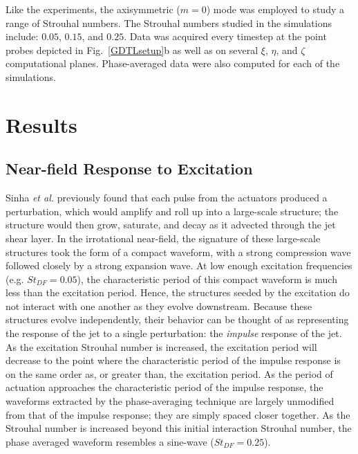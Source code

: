 \documentclass[english]{aiaa-tc}
\begin{document}
Like the experiments, the axisymmetric ($m=0$) mode was employed to
study a range of Strouhal numbers. The Strouhal numbers studied in the
simulations include: $0.05$, $0.15$, and $0.25$. Data was acquired
every timestep at the point probes depicted in Fig.~\ref{GDTLsetup}b
as well as on several $\xi$, $\eta$, and $\zeta$ computational planes.
Phase-averaged data were also computed for each of the simulations.



\section{Results}\label{results}

\subsection{Near-field Response to Excitation}
Sinha {\em et al.} \cite{sinha2013} previously found that each pulse
from the actuators produced a perturbation, which would amplify and roll up
into a large-scale structure; the structure would then grow, saturate,
and decay as it advected through the jet shear layer. In the
irrotational near-field, the signature of these large-scale structures
took the form of a compact waveform, with a strong compression wave
followed closely by a strong expansion wave. At low enough excitation
frequencies (e.g. $St_{DF} = 0.05$), the characteristic period of this
compact waveform is much less than the excitation period. Hence, the
structures seeded by the excitation do not interact with one another
as they evolve downstream. Because these structures evolve
independently, their behavior can be thought of as representing the
response of the jet to a single perturbation: the {\em impulse} response of
the jet. As the excitation Strouhal number is increased, the
excitation period will decrease to the point where the characteristic
period of the impulse response is on the same order as, or greater
than, the excitation period. As the period of actuation approaches the
characteristic period of the impulse response, the waveforms extracted
by the phase-averaging technique are largely unmodified from that of
the impulse response; they are simply spaced closer together. As the
Strouhal number is increased beyond this initial interaction Strouhal
number, the phase averaged waveform resembles a sine-wave
($St_{DF}=0.25$).  
\end{document}
